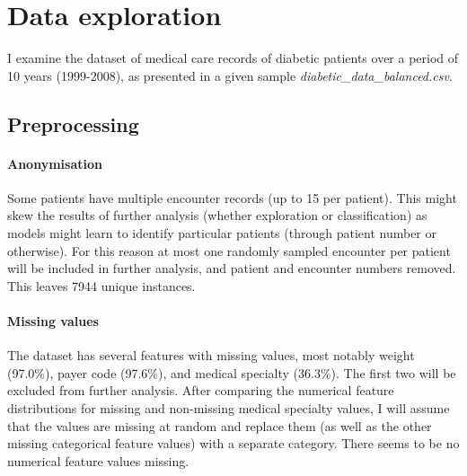 \documentclass[10pt, twocolumn]{article}
\begin{document}
\thispagestyle{first}
\pagestyle{plain}


\section{Data exploration}

I examine the dataset of medical care records of diabetic patients over a period of 10 years (1999-2008), as presented in a given sample \textit{diabetic\_data\_balanced.csv}. 

\subsection{Preprocessing}

\paragraph{Anonymisation} Some patients have multiple encounter records (up to 15 per patient). This might skew the results of further analysis (whether exploration or classification) as models might learn to identify particular patients (through patient number or otherwise). For this reason at most one randomly sampled encounter per patient will be included in further analysis, and patient and encounter numbers removed. This leaves 7944 unique instances.

\paragraph{Missing values} The dataset has several features with missing values, most notably weight (97.0\%), payer code (97.6\%), and medical specialty (36.3\%). The first two will be excluded from further analysis. After comparing the numerical feature distributions for missing and non-missing medical specialty values, I will assume that the values are missing at random and replace them (as well as the other missing categorical feature values) with a separate category. There seems to be no numerical feature values missing.
\end{document}
